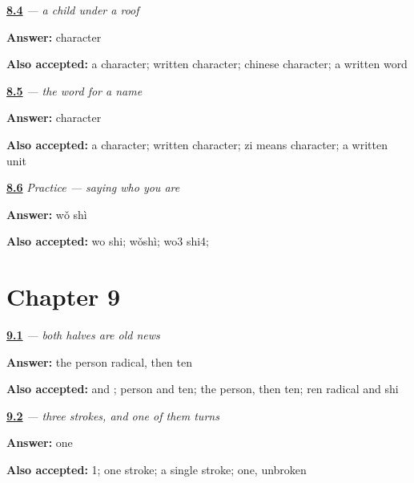 \noindent\begin{minipage}[t]{\linewidth}
\raggedright
\hyperlink{review-ZH-W08-zi-meaning}{\textbf{8.4}} \emph{ — a child under a roof}\par
\small \textbf{Answer:} character\par
\footnotesize \textbf{Also accepted:} a character; written character; chinese character; a written word
\end{minipage}\par\medskip

\noindent\begin{minipage}[t]{\linewidth}
\raggedright
\hyperlink{review-ZH-C08-mingzi-parts}{\textbf{8.5}} \emph{ — the word for a name}\par
\small \textbf{Answer:} character\par
\footnotesize \textbf{Also accepted:} a character; written character; zi means character; a written unit
\end{minipage}\par\medskip

\noindent\begin{minipage}[t]{\linewidth}
\raggedright
\hyperlink{review-ZH-C08-practice-self}{\textbf{8.6}} \emph{Practice — saying who you are}\par
\small \textbf{Answer:} wǒ shì\par
\footnotesize \textbf{Also accepted:} wo shi; wǒshì; wo3 shi4; 
\end{minipage}\par\medskip

\section*{Chapter 9}

\noindent\begin{minipage}[t]{\linewidth}
\raggedright
\hyperlink{review-ZH-W09-shen-halves}{\textbf{9.1}} \emph{ — both halves are old news}\par
\small \textbf{Answer:} the person radical, then ten\par
\footnotesize \textbf{Also accepted:}  and ; person and ten; the person, then ten; ren radical and shi
\end{minipage}\par\medskip

\noindent\begin{minipage}[t]{\linewidth}
\raggedright
\hyperlink{review-ZH-W09-me-turn}{\textbf{9.2}} \emph{ — three strokes, and one of them turns}\par
\small \textbf{Answer:} one\par
\footnotesize \textbf{Also accepted:} 1; one stroke; a single stroke; one, unbroken
\end{minipage}\par\medskip

